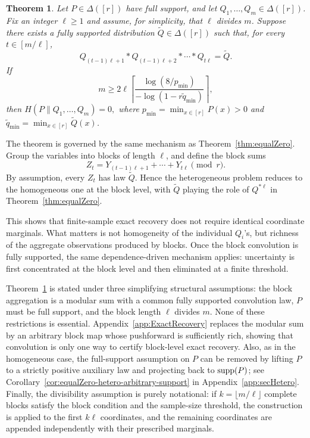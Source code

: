 \documentclass[journal]{IEEEtran}
\newtheorem{theorem}{Theorem}
\def\supp{\mathop{\rm supp}}
\newcommand{\1}{\mathbf{1}}
\begin{document}
\begin{theorem}\label{thm:equalZero-hetero}
Let $P\in\Delta([r])$ have full support, and let $Q_1,\dots,Q_m\in\Delta([r])$. 
Fix an integer $\ell\ge1$ and assume, for simplicity, that $\ell$ divides $m$. Suppose there exists a fully supported distribution $\widetilde Q\in\Delta([r])$ such that, for every $t\in [m/\ell]$,
\begin{equation}\label{eq:BlockConvolutionAssumption}
    Q_{(t-1)\ell+1} * Q_{(t-1)\ell+2} * \cdots * Q_{t\ell}=\widetilde Q.
\end{equation}
If
$$m\ge2\ell \left\lceil\frac{\log(8/p_{\min})}{-\log(1-r\widetilde q_{\min})}\right\rceil,$$
then $H(P\|Q_1,\dots,Q_m)=0,$ where $p_{\min}=\min_{x\in[r]}P(x)>0$ and $\widetilde q_{\min}=\min_{x\in[r]}\widetilde Q(x)$.
\end{theorem}
The theorem is governed by the same mechanism as
Theorem~\ref{thm:equalZero}. Group the variables into blocks of length
\(\ell\), and define the block sums
\[
Z_t
=
Y_{(t-1)\ell+1}+\cdots+Y_{t\ell}
\pmod r.
\]
By assumption, every \(Z_t\) has law \(\widetilde Q\). Hence the heterogeneous
problem reduces to the homogeneous one at the block level, with $\widetilde Q$ playing the role of $Q^{*\ell}$ in Theorem~\ref{thm:equalZero}. 

This shows that finite-sample exact recovery does not require identical
coordinate marginals. What matters is not homogeneity of the individual
\(Q_i\)'s, but richness of the aggregate observations produced by blocks. Once the block convolution is fully supported, the same dependence-driven mechanism applies: uncertainty is first concentrated at the block level and then eliminated at a finite threshold. 

Theorem~\ref{thm:equalZero-hetero} is stated under three simplifying structural assumptions: the block aggregation is a modular sum with a common fully supported convolution law, $P$ must be full support, and the block length \(\ell\) divides \(m\). None of
these restrictions is essential. Appendix~\ref{app:ExactRecovery} replaces the modular sum by an arbitrary block map whose pushforward is sufficiently rich, showing that convolution is only one way to certify block-level exact recovery. Also, as in the homogeneous case, the full-support assumption
on \(P\) can be removed by lifting \(P\) to a strictly positive auxiliary law and projecting back to \(\supp(P)\); see Corollary~\ref{cor:equalZero-hetero-arbitrary-support} in Appendix~\ref{app:secHetero}. Finally, the divisibility assumption is purely notational: if \(k=\lfloor m/\ell\rfloor\) complete blocks satisfy the block condition and the sample-size threshold, the construction is applied to the first \(k\ell\) coordinates, and the remaining coordinates are appended independently with their prescribed marginals. 
\end{document}
